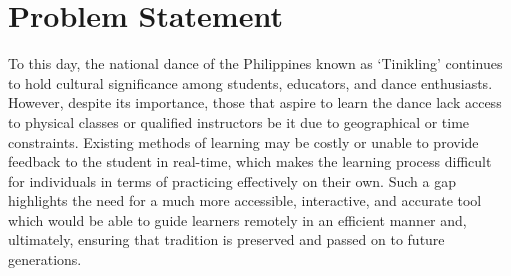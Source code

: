\section{Problem Statement}

To this day, the national dance of the Philippines known as ‘Tinikling’ continues to hold cultural significance among students, educators, and dance enthusiasts. However, despite its importance, those that aspire to learn the dance lack access to physical classes or qualified instructors be it due to geographical or time constraints. Existing methods of learning may be costly or unable to provide feedback to the student in real-time, which makes the learning process difficult for individuals in terms of practicing effectively on their own. Such a gap highlights the need for a much more accessible, interactive, and accurate tool which would be able to guide learners remotely in an efficient manner and, ultimately, ensuring that tradition is preserved and passed on to future generations. 



